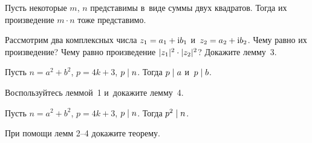 Пусть некоторые $m$, $n$ представимы  в~виде суммы двух квадратов.
Тогда их произведение $m \cdot n$ тоже представимо.

\begin{problems}

\item
Рассмотрим два комплексных числа $z_1 = a_1 + \mathrm{i} b_1$
и~$z_2 = a_2 + \mathrm{i} b_2$.
Чему равно их произведение?
Чему равно произведение $\lvert z_1 \rvert^2 \cdot \lvert z_2 \rvert^2$?
Докажите лемму~3.

\end{problems}

Пусть $n = a^2 + b^2$, $p = 4 k + 3$, $p \mathrel{\vert} n$.
Тогда $p \mathrel{\vert} a$ и~$p \mathrel{\vert} b$.

\begin{problems}

\item
Воспользуйтесь леммой~1 и~докажите лемму~4.

\item {}
Пусть $n = a^2 + b^2$, $p = 4 k +3$, $p \mathrel{\vert} n$.
Тогда $p^2 \mathrel{\vert} n$.

\item
При помощи лемм 2--4 докажите теорему.

\end{problems}

\endgroup %

